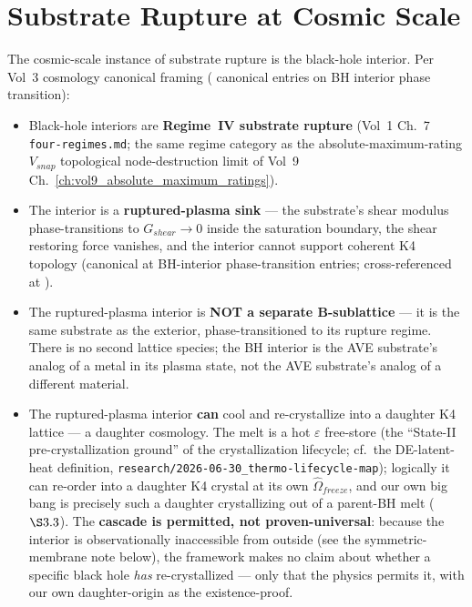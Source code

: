 \section{Substrate Rupture at Cosmic Scale}
\label{sec:vol9_cosmo_substrate_rupture}

The cosmic-scale instance of substrate rupture is the black-hole interior. Per Vol~3 cosmology canonical framing ( canonical entries on BH interior phase transition):

\begin{itemize}
    \item Black-hole interiors are \textbf{Regime~IV substrate rupture} (Vol~1 Ch.~7 \texttt{four-regimes.md}; the same regime category as the absolute-maximum-rating $V_{snap}$ topological node-destruction limit of Vol~9 Ch.~\ref{ch:vol9_absolute_maximum_ratings}).
    \item The interior is a \textbf{ruptured-plasma sink} --- the substrate's shear modulus phase-transitions to $G_{shear} \to 0$ inside the saturation boundary, the shear restoring force vanishes, and the interior cannot support coherent K4 topology (canonical at  BH-interior phase-transition entries; cross-referenced at ).
    \item The ruptured-plasma interior is \textbf{NOT a separate B-sublattice} --- it is the same substrate as the exterior, phase-transitioned to its rupture regime. There is no second lattice species; the BH interior is the AVE substrate's analog of a metal in its plasma state, not the AVE substrate's analog of a different material.
    \item The ruptured-plasma interior \textbf{can} cool and re-crystallize into a daughter K4 lattice --- a daughter cosmology. The melt is a hot $\varepsilon$ free-store (the ``State-II pre-crystallization ground'' of the crystallization lifecycle; cf.\ the DE-latent-heat definition, \texttt{research/2026-06-30\_thermo-lifecycle-map}); logically it can re-order into a daughter K4 crystal at its own $\hat{\Omega}_{freeze}$, and our own big bang is precisely such a daughter crystallizing out of a parent-BH melt ( $\S3.3$). The \textbf{cascade is permitted, not proven-universal}: because the interior is observationally inaccessible from outside (see the symmetric-membrane note below), the framework makes no claim about whether a specific black hole \emph{has} re-crystallized --- only that the physics permits it, with our own daughter-origin as the existence-proof.

\end{itemize}
